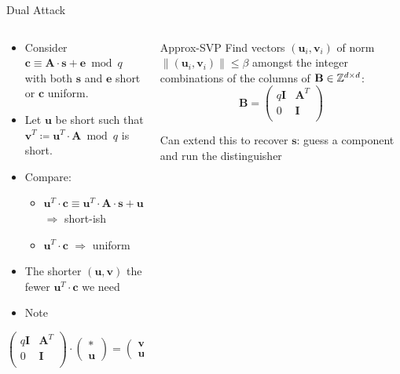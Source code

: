 \documentclass[xcolor=table,10pt,aspectratio=169]{beamer}
\renewcommand{\vec}[1]{\ensuremath{\mathbf{#1}}\xspace}
\providecommand{\mat}[1]{\ensuremath{\vec{#1}}\xspace}
\begin{document}
\begin{frame}[label={sec:org33a7565}]{Dual Attack}
\begin{columns}
\begin{column}{0.6\columnwidth}
\begin{itemize}
\item Consider \(\vec{c} \equiv \mat{A} \cdot \vec{s} + \vec{e} \bmod q\) with both \(\vec{s}\) and \(\vec{e}\) short or \(\vec{c}\) uniform.
\item Let \(\vec{u}\) be short such that \(\vec{v}^{T} \coloneqq \vec{u}^{T} \cdot \mat{A} \bmod q\)  is short.
\item Compare:
\begin{itemize}
\item \(\vec{u}^{T} \cdot \vec{c} \equiv \vec{u}^{T} \cdot \vec{A} \cdot \vec{s} + \vec{u}^{T} \cdot \vec{e} \equiv \vec{v}^{T} \cdot \vec{s} + \vec{u}^{T}\cdot \vec{e}\)  \(\Rightarrow\) \alert{short-ish}
\item \(\vec{u}^{T} \cdot \vec{c}\) \(\Rightarrow\) \alert{uniform}
\end{itemize}
\item The shorter \((\vec{u},\vec{v})\) the fewer \(\vec{u}^{T} \cdot \vec{c}\) we need
\item Note
\end{itemize}
\[
  \begin{pmatrix}
    q\mathbf{I} & \mathbf{A}^{T}\\
    0 & \mathbf{I}\\
  \end{pmatrix} \cdot
  \begin{pmatrix}
    \vec{*}\\
    \vec{u}
  \end{pmatrix} = 
  \begin{pmatrix}
    \vec{v}\\
    \vec{u}
  \end{pmatrix}  
\]
\end{column}

\begin{column}{0.4\columnwidth}
\begin{alertblock}{Approx-SVP}
Find vectors \((\vec{u}_i, \vec{v}_i)\) of norm \(\|(\vec{u}_i, \vec{v}_i)\| \leq \beta\) amongst the integer combinations of the columns of \(\mat{B} \in \ZZ^{d \times d}\):
\[
  \mat{B} = \begin{pmatrix}
 q\mat{I} & \mat{A}^{T}\\
 0        & \mat{I}\\
  \end{pmatrix}
\]
\end{alertblock}

Can extend this to recover \(\vec{s}\): guess a component and run the distinguisher
\end{column}
\end{columns}
\end{frame}
\end{document}
